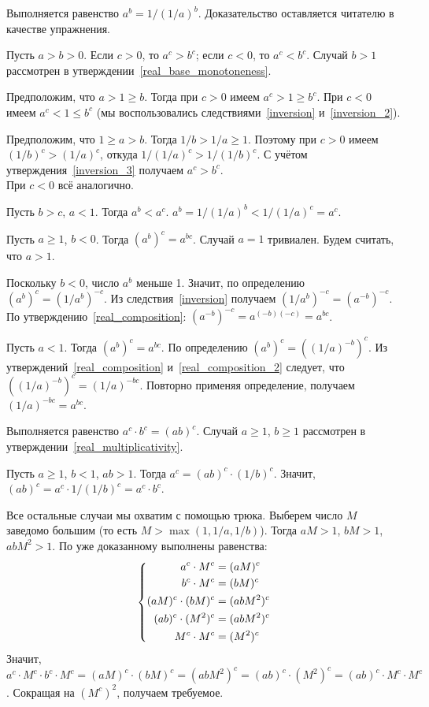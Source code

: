 \documentclass[a4paper,12pt,fleqn]{article}
\begin{document}
\label{inversion_3}
Выполняется равенство $a^b = 1/(1/a)^b$.
Доказательство оставляется читателю в качестве упражнения.

Пусть $a > b > 0$. Если $c > 0$, то $a^c > b^c$; если $c < 0$, то $a^c < b^c$.
Случай $b > 1$ рассмотрен в утверждении~\ref{real_base_monotoneness}.

Предположим, что $a > 1 \ge b$. Тогда при $c > 0$ имеем $a^c > 1 \ge b^c$. При $c < 0$ имеем $a^c < 1 \le b^c$ (мы воспользовались следствиями~\ref{inversion} и~\ref{inversion_2}).

Предположим, что $1 \ge a > b$. Тогда $1/b > 1/a \ge 1$. Поэтому при $c > 0$ имеем $(1/b)^c > (1/a)^c$, откуда $1/(1/a)^c > 1/(1/b)^c$. С учётом утверждения~\ref{inversion_3} получаем $a^c > b^c$.\\ 
При $c < 0$ всё аналогично.

Пусть $b > c$, $a < 1$. Тогда $a^b < a^c$.
$a^b = 1/(1/a)^b < 1/(1/a)^c = a^c$.

\label{real_composition_2}
Пусть $a \ge 1$, $b < 0$. Тогда $(a^b)^c = a^{bc}$.
Случай $a = 1$ тривиален. Будем считать, что $a > 1$.

Поскольку $b < 0$, число $a^b$ меньше 1. Значит, по определению $(a^b)^c = (1/a^b)^{-c}$. Из следствия~\ref{inversion} получаем $(1/a^b)^{-c} = (a^{-b})^{-c}$. По утверждению~\ref{real_composition}: $(a^{-b})^{-c} = a^{(-b)(-c)} = a^{bc}$.

Пусть $a < 1$. Тогда $(a^b)^c = a^{bc}$.
По определению $(a^b)^c = ((1/a)^{-b})^c$. Из утверждений~\ref{real_composition} и~\ref{real_composition_2} следует, что $((1/a)^{-b})^c = (1/a)^{-bc}$. Повторно применяя определение, получаем $(1/a)^{-bc} = a^{bc}$.

Выполняется равенство $a^c \cdot b^c = (ab)^c$.
Случай $a \ge 1$, $b \ge 1$ рассмотрен в утверждении~\ref{real_multiplicativity}.

Пусть $a \ge 1$, $b < 1$, $ab > 1$. Тогда $a^c = (ab)^c \cdot (1/b)^c$. Значит, $(ab)^c = a^c \cdot 1/(1/b)^c = a^c \cdot b^c$.

Все остальные случаи мы охватим с помощью трюка. Выберем число $M$ заведомо большим (то есть $M > \max(1, 1/a, 1/b)$). Тогда $aM > 1$, $bM > 1$, $abM^2 > 1$. По уже доказанному выполнены равенства: 
\[
\left\{\begin{aligned}
a^c \cdot M^c &= (aM)^c\\
b^c \cdot M^c &= (bM)^c\\
(aM)^c \cdot (bM)^c &= (abM^2)^c\\
(ab)^c \cdot (M^2)^c &= (abM^2)^c\\
M^c \cdot M^c &= (M^2)^c\\
\end{aligned}\right.
\]
Значит, $a^c \cdot M^c \cdot b^c \cdot M^c = (aM)^c \cdot (bM)^c = (abM^2)^c = (ab)^c \cdot (M^2)^c = (ab)^c \cdot M^c \cdot M^c$. Сокращая на $(M^c)^2$, получаем требуемое.
\end{document}
